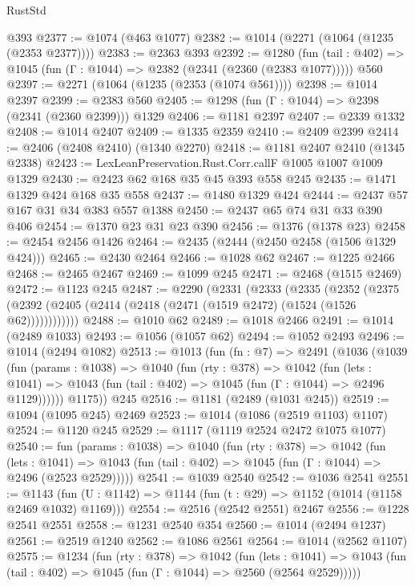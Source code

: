 \begin{lexlean}{RustStd}
\begin{coremodule}
    @393
@2377 := @1074 (@463 @1077)
@2382 := @1014 (@2271 (@1064 (@1235 (@2353 @2377))))
@2383 := @2363 @393
@2392 := @1280
    (fun (tail : @402) => @1045 (fun (Γ : @1044) => @2382 (@2341 (@2360 (@2383 @1077)))))
    @560
@2397 := @2271 (@1064 (@1235 (@2353 (@1074 @561))))
@2398 := @1014 @2397
@2399 := @2383 @560
@2405 := @1298 (fun (Γ : @1044) => @2398 (@2341 (@2360 @2399))) @1329
@2406 := @1181 @2397
@2407 := @2339 @1332
@2408 := @1014 @2407
@2409 := @1335 @2359
@2410 := @2409 @2399
@2414 := @2406 (@2408 @2410) (@1340 @2270)
@2418 := @1181 @2407 @2410 (@1345 @2338)
@2423 := LexLeanPreservation.Rust.Corr.callF @1005 @1007 @1009 @1329
@2430 := @2423 @62 @168 @35 @45 @393 @558 @245
@2435 := @1471 @1329 @424 @168 @35 @558
@2437 := @1480 @1329 @424
@2444 := @2437 @57 @167 @31 @34 @383 @557 @1388
@2450 := @2437 @65 @74 @31 @33 @390 @406
@2454 := @1370 @23 @31 @23 @390
@2456 := @1376 (@1378 @23)
@2458 := @2454 @2456 @1426
@2464 := @2435 (@2444 (@2450 @2458 (@1506 @1329 @424)))
@2465 := @2430 @2464
@2466 := @1028 @62
@2467 := @1225 @2466
@2468 := @2465 @2467
@2469 := @1099 @245
@2471 := @2468 (@1515 @2469)
@2472 := @1123 @245
@2487 := @2290
    (@2331
      (@2333
        (@2335
          (@2352
            (@2375 (@2392 (@2405 (@2414 (@2418 (@2471 (@1519 @2472) (@1524 (@1526 @62))))))))))))
@2488 := @1010 @62
@2489 := @1018 @2466
@2491 := @1014 (@2489 @1033)
@2493 := @1056 (@1057 @62)
@2494 := @1052 @2493
@2496 := @1014 (@2494 @1082)
@2513 := @1013
    (fun (fn : @7) =>
    @2491
      (@1036
        (@1039
          (fun (params : @1038) =>
          @1040
            (fun (rty : @378) =>
            @1042
              (fun (lets : @1041) =>
              @1043 (fun (tail : @402) => @1045 (fun (Γ : @1044) => @2496 @1129))))))
        @1175))
    @245
@2516 := @1181 (@2489 (@1031 @245))
@2519 := @1094 (@1095 @245) @2469
@2523 := @1014 (@1086 (@2519 @1103) @1107)
@2524 := @1120 @245
@2529 := @1117 (@1119 @2524 @2472 @1075 @1077)
@2540 := fun (params : @1038) =>
  @1040
    (fun (rty : @378) =>
    @1042
      (fun (lets : @1041) =>
      @1043 (fun (tail : @402) => @1045 (fun (Γ : @1044) => @2496 (@2523 @2529)))))
@2541 := @1039 @2540
@2542 := @1036 @2541
@2551 := @1143 (fun (U : @1142) => @1144 (fun (t : @29) => @1152 (@1014 (@1158 @2469 @1032) @1169)))
@2554 := @2516 (@2542 @2551) @2467
@2556 := @1228 @2541 @2551
@2558 := @1231 @2540 @354
@2560 := @1014 (@2494 @1237)
@2561 := @2519 @1240
@2562 := @1086 @2561
@2564 := @1014 (@2562 @1107)
@2575 := @1234
    (fun (rty : @378) =>
    @1042
      (fun (lets : @1041) =>
      @1043 (fun (tail : @402) => @1045 (fun (Γ : @1044) => @2560 (@2564 @2529)))))

\end{coremodule}
\end{lexlean}
